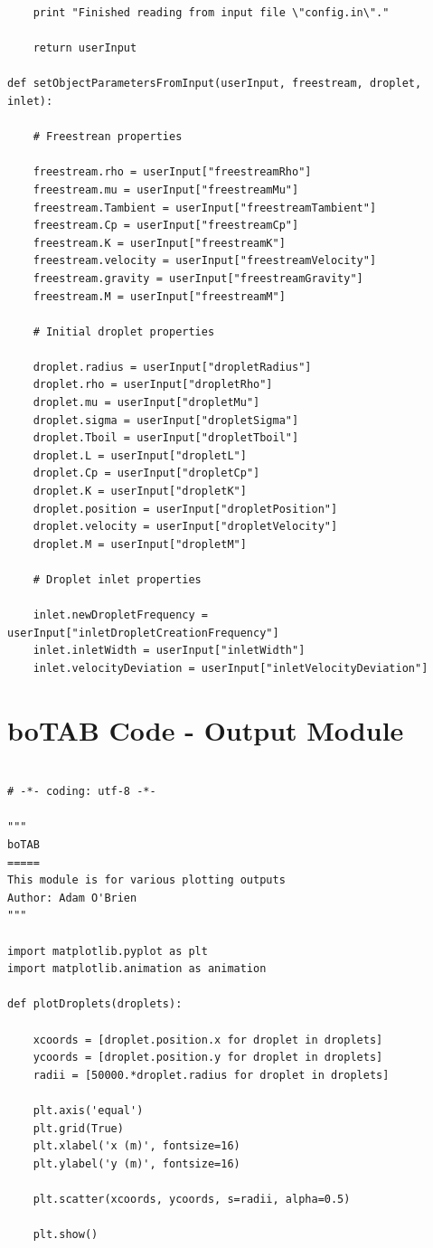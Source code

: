 \documentclass[12pt]{article}
\begin{document}
\begin{lstlisting}
    print "Finished reading from input file \"config.in\"."

    return userInput

def setObjectParametersFromInput(userInput, freestream, droplet, inlet):

    # Freestrean properties

    freestream.rho = userInput["freestreamRho"]
    freestream.mu = userInput["freestreamMu"]
    freestream.Tambient = userInput["freestreamTambient"]
    freestream.Cp = userInput["freestreamCp"]
    freestream.K = userInput["freestreamK"]
    freestream.velocity = userInput["freestreamVelocity"]
    freestream.gravity = userInput["freestreamGravity"]
    freestream.M = userInput["freestreamM"]

    # Initial droplet properties

    droplet.radius = userInput["dropletRadius"]
    droplet.rho = userInput["dropletRho"]
    droplet.mu = userInput["dropletMu"]
    droplet.sigma = userInput["dropletSigma"]
    droplet.Tboil = userInput["dropletTboil"]
    droplet.L = userInput["dropletL"]
    droplet.Cp = userInput["dropletCp"]
    droplet.K = userInput["dropletK"]
    droplet.position = userInput["dropletPosition"]
    droplet.velocity = userInput["dropletVelocity"]
    droplet.M = userInput["dropletM"]

    # Droplet inlet properties

    inlet.newDropletFrequency = userInput["inletDropletCreationFrequency"]
    inlet.inletWidth = userInput["inletWidth"]
    inlet.velocityDeviation = userInput["inletVelocityDeviation"]

\end{lstlisting}

\newpage
\section{boTAB Code - Output Module}

\begin{lstlisting}

# -*- coding: utf-8 -*-

"""
boTAB
=====
This module is for various plotting outputs
Author: Adam O'Brien
"""

import matplotlib.pyplot as plt
import matplotlib.animation as animation

def plotDroplets(droplets):

    xcoords = [droplet.position.x for droplet in droplets]
    ycoords = [droplet.position.y for droplet in droplets]
    radii = [50000.*droplet.radius for droplet in droplets]

    plt.axis('equal')
    plt.grid(True)
    plt.xlabel('x (m)', fontsize=16)
    plt.ylabel('y (m)', fontsize=16)

    plt.scatter(xcoords, ycoords, s=radii, alpha=0.5)

    plt.show()
    
\end{lstlisting}
\end{document}
